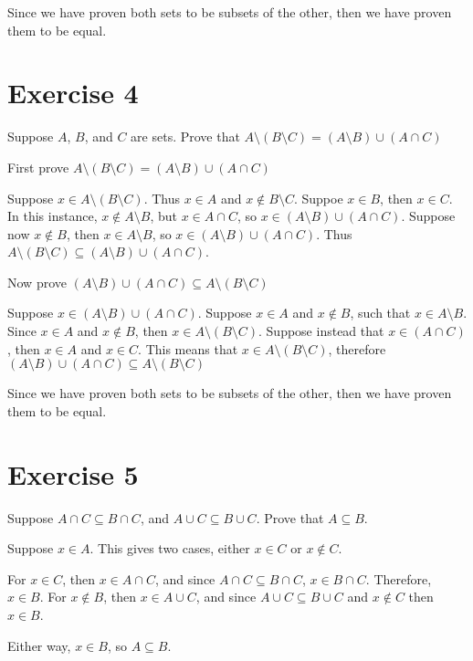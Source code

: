 \documentclass[11pt]{article}
\begin{document}
Since we have proven both sets to be subsets of the other, then we have proven 
them to be equal.

\section*{Exercise 4}

Suppose $A$, $B$, and $C$ are sets. Prove that 
$A \setminus (B \setminus C) = (A \setminus B) \cup (A \cap C)$

First prove $A \setminus (B \setminus C) = (A \setminus B) \cup (A \cap C)$

Suppose $x \in A \setminus (B \setminus C)$. Thus 
$x \in A$ and $x \notin B \setminus C$. Suppoe $x \in B$, then $x \in C$. In this 
instance, $x \notin A \setminus B$, but $x \in A \cap C$, so 
$x \in (A \setminus B) \cup (A \cap C)$. Suppose now $x \notin B$, then 
$x \in A \setminus B$, so $x \in (A \setminus B) \cup (A \cap C)$. Thus 
$A \setminus (B \setminus C) \subseteq (A \setminus B) \cup (A \cap C)$.

Now prove $(A \setminus B) \cup (A \cap C) \subseteq A \setminus (B \setminus C)$

Suppose $x \in (A \setminus B) \cup (A \cap C)$. Suppose $x \in A$ and 
$x \notin B$, such that $x \in A \setminus B$. Since $x \in A$ and $x \notin B$,
then $x \in A \setminus (B \setminus C)$. Suppose instead that $x \in (A \cap C)$,
then $x \in A$ and $x \in C$. This means that $x \in A \setminus (B \setminus C)$,
therefore $(A \setminus B) \cup (A \cap C) \subseteq A \setminus (B \setminus C)$

Since we have proven both sets to be subsets of the other, then we have proven 
them to be equal.

\section*{Exercise 5}

Suppose $A \cap C \subseteq B \cap C$, and $A \cup C \subseteq B \cup C$. Prove 
that $A \subseteq B$.

Suppose $x \in A$. This gives two cases, either $x \in C$ or $x \notin C$.

For $x \in C$, then $x \in A \cap C$, and since $A \cap C \subseteq B \cap C$,
$x \in B \cap C$. Therefore, $x \in B$. For $x \notin B$, then $x \in A \cup C$,
and since $A \cup C \subseteq B \cup C$ and $x \notin C$ then $x \in B$. 

Either way, $x \in B$, so $A \subseteq B$.
\end{document}
